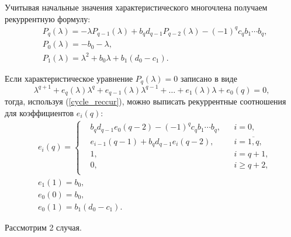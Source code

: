 Учитывая начальные значения характеристического многочлена получаем рекуррентную формулу:
\begin{equation} \label{cycle_reccur}
    \begin{split}
        & P_q (\lambda) = -\lambda P_{q-1} (\lambda) + b_q d_{q-1} P_{q-2} (\lambda) - (-1)^{q} c_q b_1 \cdots b_q, \\
        & P_0 (\lambda) = - b_0 -\lambda, \\
        & P_1 (\lambda) = \lambda^2 + b_0 \lambda + b_1 (d_0 - c_1).
    \end{split}
\end{equation}

Если характеристическое уравнение \( P_q (\lambda) = 0 \) записано в виде
\begin{equation*}
    \lambda^{q+1} + e_q(\lambda) \lambda^q + e_{q-1}(\lambda) \lambda^{q-1} + \dots + e_{1}(\lambda) \lambda + e_0(q) = 0,
\end{equation*}
тогда, используя (\ref{cycle_reccur}), можно выписать рекуррентные  соотношения для коэффициентов \(e_i (q)\):
\begin{equation} \label{cycle_reccur_coeffs}
    \begin{split}
        & e_i (q) = \left\{\begin{split}
        & b_q d_{q-1} e_0(q-2) - (-1)^q c_q b_1 \cdots b_q, && i = 0, \\
        & e_{i-1} (q-1) + b_q d_{q-1} e_i (q-2), && i = \overline{1,q}, \\
        & 1, && i = q+1, \\
        & 0, && i \geq q+2, \\
    \end{split}\right. \\
    & e_{1} (1) = b_0, \\
    & e_{0} (0) = b_0, \\
    & e_{0} (1) = b_1 (d_0 - c_1).
    \end{split}
\end{equation}

Рассмотрим 2 случая.

